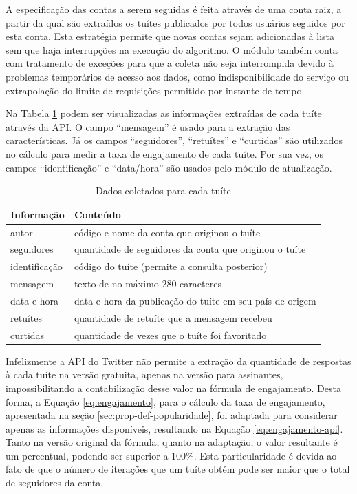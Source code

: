\documentclass[oneside,openright,12pt]{ufsm_2015} %
\begin{document}
    \par A especificação das contas a serem seguidas é feita através de uma conta raiz, a partir da qual são extraídos os tuítes publicados por todos usuários seguidos por esta conta. Esta estratégia permite que novas contas sejam adicionadas à lista sem que haja interrupções na execução do algoritmo. O módulo também conta com tratamento de exceções para que a coleta não seja interrompida devido à problemas temporários de acesso aos dados, como indisponibilidade do serviço ou extrapolação do limite de requisições permitido por instante de tempo.
    
    \par Na Tabela \ref{tab:dados-coleta} podem ser visualizadas as informações extraídas de cada tuíte através da API. O campo ``mensagem'' é usado para a extração das características. Já os campos ``seguidores'', ``retuítes'' e ``curtidas'' são utilizados no cálculo para medir a taxa de engajamento de cada tuíte. Por sua vez, os campos ``identificação'' e ``data/hora'' são usados pelo módulo de atualização.
    
    \begin{table}[ht]
    \centering
    \caption{Dados coletados para cada tuíte}
    \label{tab:dados-coleta}
    \begin{tabular}{|l|l|}
    \hline
    \textbf{Informação} & \textbf{Conteúdo} \\ \hline
    autor &  código e nome da conta que originou o tuíte \\ \hline
    seguidores &  quantidade de seguidores da conta que originou o tuíte \\ \hline
    identificação & código do tuíte (permite a consulta posterior) \\ \hline
    mensagem & texto de no máximo 280 caracteres \\ \hline
    data e hora & data e hora da publicação do tuíte em seu país de origem \\ \hline
    retuítes & quantidade de retuíte que a mensagem recebeu \\ \hline
    curtidas & quantidade de vezes que o tuíte foi favoritado \\ \hline
    \end{tabular}
    \end{table}
    
    \par Infelizmente a API do Twitter não permite a extração da quantidade de respostas à cada tuíte na versão gratuita, apenas na versão para assinantes, impossibilitando a contabilização desse valor na fórmula de engajamento. Desta forma, a Equação \ref{eq:engajamento}, para o cálculo da taxa de engajamento, apresentada na seção \ref{sec:prop-def-popularidade}, foi adaptada para considerar apenas as informações disponíveis, resultando na Equação \ref{eq:engajamento-api}. Tanto na versão original da fórmula, quanto na adaptação, o valor resultante é um percentual, podendo ser superior a 100\%. Esta particularidade é devida ao fato de que o número de iterações que um tuíte obtém pode ser maior que o total de seguidores da conta.
    
\end{document}
